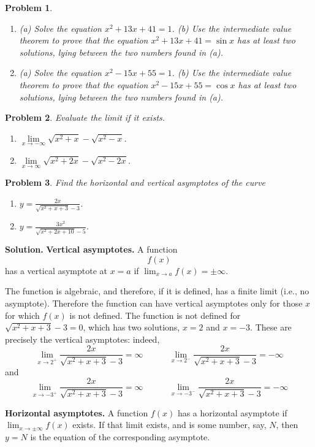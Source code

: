 \documentclass{article}
\newtheorem{problem}{Problem}
\begin{document}
\begin{problem}~
\begin{enumerate}
\item (a) Solve the equation $x^2+13x+41=1$.  (b) Use the intermediate value theorem to prove that the equation $x^2+13x+41=\sin  x$ has at least two solutions, lying between the two numbers found in (a).
\item (a) Solve the equation $x^2-15x+55=1$.  (b) Use the intermediate value theorem to prove that the equation $x^2-15x+55=\cos  x$ has at least two solutions, lying between the two numbers found in (a).
\end{enumerate}
\end{problem}
\begin{problem}
Evaluate the limit if it exists.
\begin{enumerate}
\item $\lim\limits_{x\to-\infty}\sqrt{x^2+x}-\sqrt{x^2-x}$. 
\item $\lim\limits_{x\to\infty}\sqrt{x^2+2x}-\sqrt{x^2-2x} $. 
\end{enumerate}
\end{problem}
\begin{problem}
Find the horizontal and vertical asymptotes of the curve
\begin{enumerate}
\item $y=\frac{2x}{\sqrt{x^2+x+3}-3}$. 
\item $y=\frac{3x^2}{\sqrt{x^2+2x+10}-5}$. 
\end{enumerate}
\end{problem}
\textbf{Solution. } 
\textbf{Vertical asymptotes.} A function $$f(x)$$ has a vertical asymptote at $x=a$ if $\lim_{x\to a} f(x)=\pm \infty$. 

The function is algebraic, and therefore, if it is defined, has a finite limit (i.e., no asymptote). Therefore the function can have vertical asymptotes only for those $x$ for which $f(x)$ is not defined. The function is not defined for $\sqrt{x^2+x+3}-3=0$, which has two solutions, $x=2$ and $x=-3$. These are precisely the vertical asymptotes: indeed, 
\[
\lim_{x\to 2^+} \frac{2x}{\sqrt{x^2+x+3}-3}=\infty \quad \quad \quad 
\lim_{x\to 2^-} \frac{2x}{\sqrt{x^2+x+3}-3}=-\infty 
\]
and
\[
\lim_{x\to -3^+} \frac{2x}{\sqrt{x^2+x+3}-3}=\infty \quad \quad \quad 
\lim_{x\to -3^-} \frac{2x}{\sqrt{x^2+x+3}-3}=-\infty 
\]

\textbf{Horizontal asymptotes.} A function $f(x)$ has a horizontal asymptote if $\lim_{x\to \pm\infty} f(x)$ exists. If that limit exists, and is some number, say, $N$, then $y=N$ is the equation of the corresponding asymptote.
\end{document}
